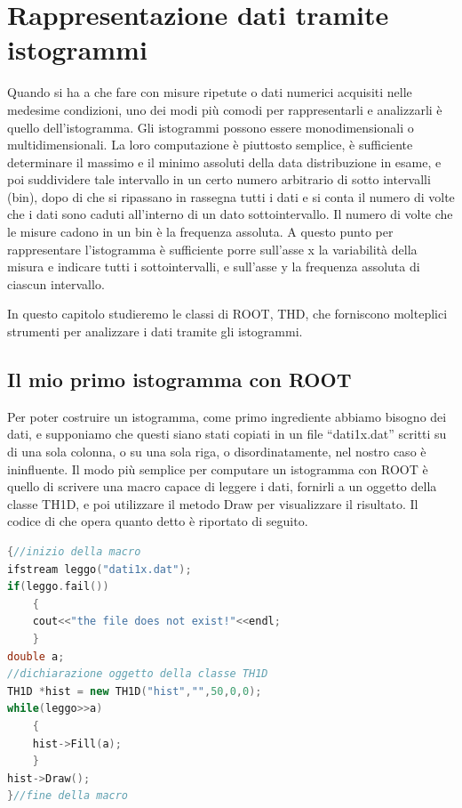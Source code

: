 \documentclass[11pt,fleqn]{book} %
\begin{document}
\chapter{Rappresentazione dati tramite istogrammi}

Quando si ha a che fare con misure ripetute o dati numerici acquisiti nelle medesime condizioni, uno dei modi più comodi per rappresentarli e analizzarli è quello dell'istogramma. Gli istogrammi possono essere monodimensionali o multidimensionali. La loro computazione è piuttosto semplice, è sufficiente determinare il massimo e il minimo assoluti della data distribuzione in esame, e poi suddividere tale intervallo in un certo numero arbitrario di sotto intervalli (bin), dopo di che si ripassano in rassegna tutti i dati e si conta il numero di volte che i dati sono caduti all'interno di un dato sottointervallo. Il numero di volte che le misure cadono in un bin è la frequenza assoluta.
A questo punto per rappresentare l'istogramma è sufficiente porre sull'asse x la variabilità della misura e indicare tutti i sottointervalli, e sull'asse y la frequenza assoluta di ciascun intervallo. 

In questo capitolo studieremo le classi di ROOT, THD, che forniscono molteplici strumenti per analizzare i dati tramite gli istogrammi.



\section{Il mio primo istogramma con ROOT}


Per poter costruire un istogramma, come primo ingrediente abbiamo bisogno dei dati, e supponiamo che questi siano stati copiati in un file ``dati1x.dat'' scritti su di una sola colonna, o su una sola riga, o disordinatamente, nel nostro caso è ininfluente.
Il modo più semplice per computare un istogramma con ROOT è quello di scrivere una macro capace di leggere i dati, fornirli a un oggetto della classe TH1D, e poi utilizzare il metodo Draw per visualizzare il risultato. Il codice di che opera quanto detto è riportato di seguito.

\begin{lstlisting}[language=c++]
{//inizio della macro
ifstream leggo("dati1x.dat");
if(leggo.fail())
    {
    cout<<"the file does not exist!"<<endl;
    }
double a;
//dichiarazione oggetto della classe TH1D
TH1D *hist = new TH1D("hist","",50,0,0);
while(leggo>>a)
    {
    hist->Fill(a);  
    }
hist->Draw();
}//fine della macro
\end{lstlisting}
\end{document}
